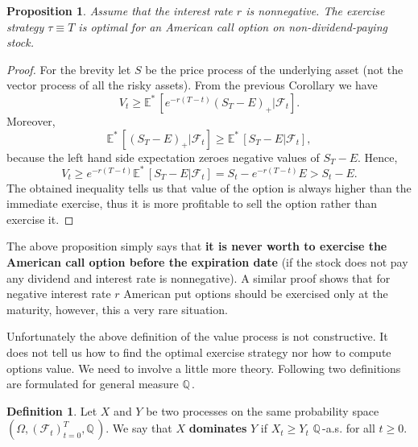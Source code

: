 \documentclass[a4paper,12pt, oneside]{book}
\newtheorem{prop}[thm]{Proposition}
\theoremstyle{definition}
\newtheorem{mydef}{Definition}[chapter]
\theoremstyle{remark}
\def\Q{{\mathbb{Q}}\,}
\def\Em{{\mathbb{E}^*}\,}
\begin{document}
\begin{prop}
 Assume that the interest rate $r$ is nonnegative. The exercise strategy $\tau \equiv T$ is optimal for an American call option on non-dividend-paying stock.
\end{prop}
\begin{proof}
 For the brevity let $S$ be the price process of the underlying asset (not the vector process of all the risky assets). From the previous Corollary we have
 \[V_t \geq \Em[e^{-r(T-t)}(S_T - E)_+ | \mathcal{F}_t].\] Moreover,
 \[\Em[(S_T - E)_+ | \mathcal{F}_t] \geq \Em[S_T - E | \mathcal{F}_t],\]
 because the left hand side expectation zeroes negative values of $S_T - E$. Hence,
 \[ V_t \geq e^{-r(T-t)}\Em[S_T - E | \mathcal{F}_t] = S_t - e^{-r(T-t)}E > S_t - E.\]
 The obtained inequality tells us that value of the option is always higher than the immediate exercise, thus it is more profitable to sell the option rather than exercise it.
\end{proof}
The above proposition simply says that \textbf{it is never worth to exercise the American call option before the expiration date} (if the stock does not pay any dividend and interest rate is nonnegative). A similar proof shows that for negative interest rate $r$ American put options should be exercised only at the maturity, however, this a very rare situation.

Unfortunately the above definition of the value process is not constructive. It does not tell us how to find the optimal exercise strategy nor how to compute options value. We need to involve a little more theory. Following two definitions are formulated for general measure $\Q$. 

\begin{mydef}
 Let $X$ and $Y$ be two processes on the same probability space\\ $(\Omega, (\mathcal{F}_t)_{t=0}^T, \Q)$. We say that $X$ \textbf{dominates} $Y$ if $ X_t \geq Y_t$ $\Q$-a.s. for all $t \geq 0$.
\end{mydef}
 
\end{document}
